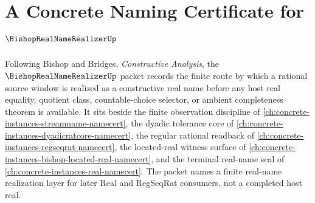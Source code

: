 \chapter{A Concrete Naming Certificate for $\BishopRealNameRealizerUp$}
\label{ch:concrete-instances-bishop-real-name-realizer-namecert}

Following Bishop and Bridges, \emph{Constructive Analysis}, the $\BishopRealNameRealizerUp$ packet records the finite route by which a rational source window is realized as a constructive real name before any host real equality, quotient class, countable-choice selector, or ambient completeness theorem is available. It sits beside the finite observation discipline of \autoref{ch:concrete-instances-streamname-namecert}, the dyadic tolerance core of \autoref{ch:concrete-instances-dyadicratcore-namecert}, the regular rational readback of \autoref{ch:concrete-instances-regseqrat-namecert}, the located-real witness surface of \autoref{ch:concrete-instances-bishop-located-real-namecert}, and the terminal real-name seal of \autoref{ch:concrete-instances-real-namecert}. The packet names a finite real-name realization layer for later Real and RegSeqRat consumers, not a completed host real.


